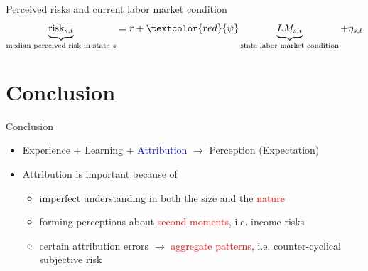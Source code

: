 \documentclass{beamer}
\begin{document}
	\begin{frame}{Perceived risks and current labor market condition}
	\begin{eqnarray*}
		\underbrace{\overline{\text{risk}_{s,t}} }_{\text{median perceived risk in state $s$}}= r + \textcolor{red}{\psi} \underbrace{LM_{s,t}}_{\text{state labor market condition}}  + \eta_{s,t}
	\end{eqnarray*}
		\begin{table}
			\centering
			\label{macro_corr_he_state}
		\end{table}
	\end{frame}
	


\section{Conclusion}

\begin{frame}{Conclusion}
	\begin{itemize}
		\item Experience + Learning + \textcolor{blue}{Attribution} $\rightarrow$ Perception (Expectation) 
		\item Attribution is important because of
		\begin{itemize}
			\item imperfect understanding in both the size and the \textcolor{red}{nature} 
			\item forming perceptions about \textcolor{red}{second moments}, i.e. income risks
			\item certain attribution errors $\rightarrow$ \textcolor{red}{aggregate patterns}, i.e. counter-cyclical subjective risk 
		\end{itemize} 
	\end{itemize}
\end{frame}



\end{document}
